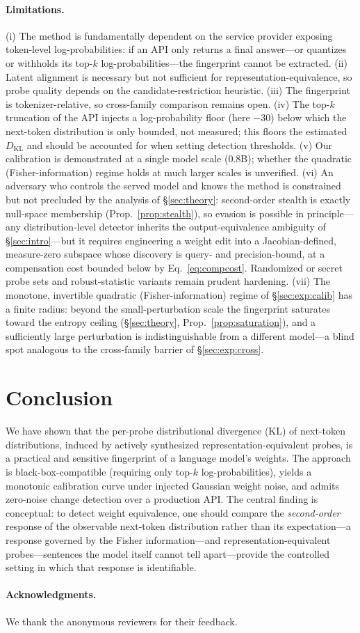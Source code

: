 \documentclass[11pt]{article}
\theoremstyle{definition}
\begin{document}
\paragraph{Limitations.}
(i) The method is fundamentally dependent on the service provider exposing
token-level log-probabilities: if an API only returns a final answer---or
quantizes or withholds its top-$k$ log-probabilities---the fingerprint cannot
be extracted. (ii) Latent alignment is necessary but not
sufficient for representation-equivalence, so probe quality depends on the
candidate-restriction heuristic. (iii) The fingerprint
is tokenizer-relative, so cross-family comparison remains open. (iv) The
top-$k$ truncation of the API injects a log-probability floor (here $-30$)
below which the next-token distribution is only bounded, not measured; this
floors the estimated $D_{\mathrm{KL}}$ and should be accounted for when setting
detection thresholds.
(v) Our calibration is demonstrated at a single model scale ($0.8$B); whether
the quadratic (Fisher-information) regime holds at much larger scales is
unverified. (vi) An adversary
who controls the served model and knows the method is constrained but not
precluded by the analysis of \S\ref{sec:theory}: second-order stealth is
exactly null-space membership (Prop.~\ref{prop:stealth}), so evasion is
possible in principle---any distribution-level detector inherits the
output-equivalence ambiguity of \S\ref{sec:intro}---but it requires engineering
a weight edit into a Jacobian-defined, measure-zero subspace whose discovery is
query- and precision-bound, at a compensation cost bounded below by
Eq.~\eqref{eq:compcost}. Randomized or secret probe sets and robust-statistic
variants remain prudent hardening. (vii) The monotone, invertible quadratic (Fisher-information)
regime of \S\ref{sec:exp:calib} has a finite radius: beyond the
small-perturbation scale the fingerprint saturates toward the entropy ceiling
(\S\ref{sec:theory}, Prop.~\ref{prop:saturation}), and a sufficiently large
perturbation is indistinguishable from a different model---a blind spot
analogous to the cross-family barrier of \S\ref{sec:exp:cross}.

\section{Conclusion}
\label{sec:concl}

We have shown that the per-probe distributional divergence (KL) of next-token
distributions, induced by actively synthesized representation-equivalent
probes, is a practical and sensitive fingerprint of a language model's weights.
The approach is black-box-compatible (requiring only top-$k$
log-probabilities), yields a monotonic calibration curve under injected
Gaussian weight noise, and admits zero-noise change detection over a production
API. The central finding is conceptual: to detect weight equivalence, one
should compare the \emph{second-order} response of the observable next-token
distribution rather than its expectation---a response governed by the Fisher
information---and representation-equivalent probes---sentences the model itself
cannot tell apart---provide the controlled setting in which that response is
identifiable.

\paragraph{Acknowledgments.} We thank the anonymous reviewers for their
feedback.



\end{document}
